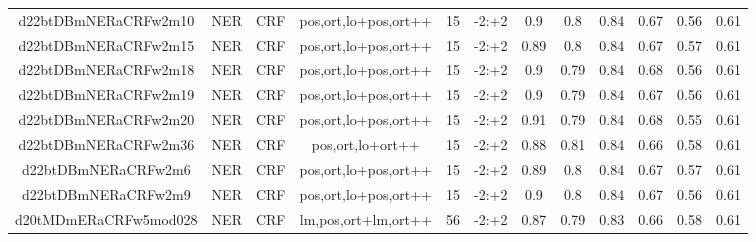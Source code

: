 \documentclass[a4paper]{article}
\begin{document}
\begin{landscape}
\begin{center}
\begin{tabular}{ |c|c|c|c|c|c|c|c|c|c|c|c|}
 
 	
 	\small{ d22btDBmNERaCRFw2m10 } & \small{ NER} & \small{  CRF }  & pos,ort,lo+pos,ort++  &  15 &  \small{  -2:+2 }  &  0.9 & 0.8 & 0.84  &  0.67 & 0.56 & 0.61 \\
 	

 
 	
 	\small{ d22btDBmNERaCRFw2m15 } & \small{ NER} & \small{  CRF }  & pos,ort,lo+pos,ort++  &  15 &  \small{  -2:+2 }  &  0.89 & 0.8 & 0.84  &  0.67 & 0.57 & 0.61 \\
 	

 
 	
 	\small{ d22btDBmNERaCRFw2m18 } & \small{ NER} & \small{  CRF }  & pos,ort,lo+pos,ort++  &  15 &  \small{  -2:+2 }  &  0.9 & 0.79 & 0.84  &  0.68 & 0.56 & 0.61 \\
 	

 
 	
 	\small{ d22btDBmNERaCRFw2m19 } & \small{ NER} & \small{  CRF }  & pos,ort,lo+pos,ort++  &  15 &  \small{  -2:+2 }  &  0.9 & 0.79 & 0.84  &  0.67 & 0.56 & 0.61 \\
 	

 
 	
 	\small{ d22btDBmNERaCRFw2m20 } & \small{ NER} & \small{  CRF }  & pos,ort,lo+pos,ort++  &  15 &  \small{  -2:+2 }  &  0.91 & 0.79 & 0.84  &  0.68 & 0.55 & 0.61 \\
 	

 
 	
 	\small{ d22btDBmNERaCRFw2m36 } & \small{ NER} & \small{  CRF }  & pos,ort,lo+ort++  &  15 &  \small{  -2:+2 }  &  0.88 & 0.81 & 0.84  &  0.66 & 0.58 & 0.61 \\
 	

 
 	
 	\small{ d22btDBmNERaCRFw2m6 } & \small{ NER} & \small{  CRF }  & pos,ort,lo+pos,ort++  &  15 &  \small{  -2:+2 }  &  0.89 & 0.8 & 0.84  &  0.67 & 0.57 & 0.61 \\
 	

 
 	
 	\small{ d22btDBmNERaCRFw2m9 } & \small{ NER} & \small{  CRF }  & pos,ort,lo+pos,ort++  &  15 &  \small{  -2:+2 }  &  0.9 & 0.8 & 0.84  &  0.67 & 0.56 & 0.61 \\
 	

 
 	
 	\small{ d20tMDmERaCRFw5mod028 } & \small{ NER} & \small{  CRF }  & lm,pos,ort+lm,ort++  &  56 &  \small{  -2:+2 }  &  0.87 & 0.79 & 0.83  &  0.66 & 0.58 & 0.61 \\
 	


\end{tabular}
\end{center}
\end{landscape}
\end{document}
